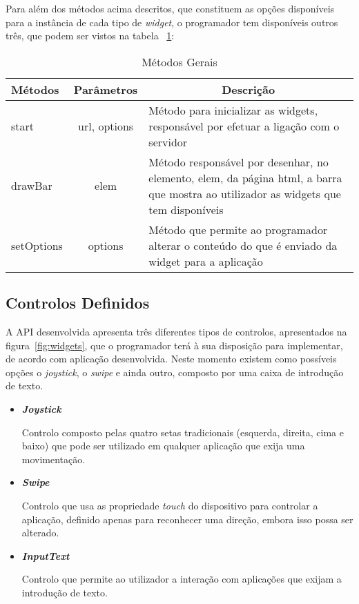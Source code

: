 Para além dos métodos acima descritos, que constituem as opções disponíveis para a instância de cada tipo de \textit{widget}, o programador tem disponíveis outros três, que podem ser vistos na tabela ~\ref{table:metodos_g}:

\pagebreak

	\begin{table}[ht]
 	\renewcommand{\arraystretch}{1.5}
	\centering
	\caption{Métodos Gerais}
	\begin{tabular}{ p{2cm} p{2cm} p{10cm}  }
	\hline
	\textbf{Métodos} & \multicolumn{1}{c}{\textbf{Parâmetros}} & \multicolumn{1}{c}{\textbf{Descrição}} \\
	\hline
	start & \multicolumn{1}{c}{url, options} &Método para inicializar as widgets, responsável por efetuar a ligação com o servidor \\
	\hline
	drawBar & \multicolumn{1}{c}{elem} &Método responsável por desenhar, no elemento, elem, da página html, a barra que mostra ao utilizador as widgets que tem disponíveis \\
	\hline
	setOptions & \multicolumn{1}{c}{options} &Método que permite ao programador alterar o conteúdo do que é enviado da widget para a aplicação  \\
	\hline
	\end{tabular}
	\label{table:metodos_g}
	\end{table}

\subsection{Controlos Definidos}

	A API desenvolvida apresenta três diferentes tipos de controlos, apresentados na figura~\ref{fig:widgets}, que o programador terá à sua disposição para implementar, de acordo com aplicação desenvolvida. Neste momento existem como possíveis opções o \textit{joystick}, o \textit{swipe} e ainda outro, composto por uma caixa de introdução de texto.

	\begin{itemize}

	\item \textbf{\textit{Joystick}}

		Controlo composto pelas quatro setas tradicionais (esquerda, direita, cima e baixo) que pode ser utilizado em qualquer aplicação que exija uma movimentação.

	\item \textbf{\textit{Swipe}}

		Controlo que usa as propriedade \textit{touch} do dispositivo para controlar a aplicação, definido apenas para reconhecer uma direção, embora isso possa ser alterado.

	\item \textbf{\textit{InputText}}

		Controlo que permite ao utilizador a interação com aplicações que exijam a introdução de texto.

	\end{itemize}

